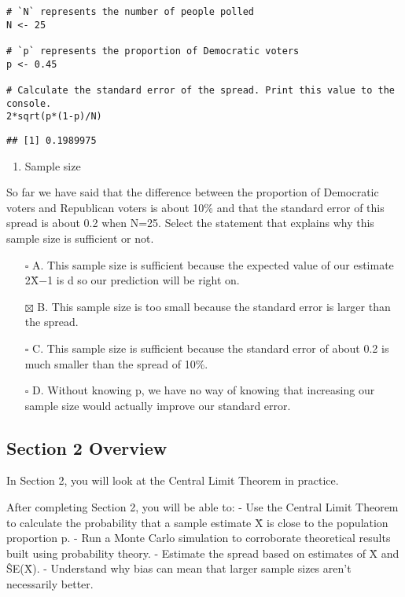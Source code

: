 \documentclass[
]{article}
\providecommand{\tightlist}{%
  \setlength{\itemsep}{0pt}\setlength{\parskip}{0pt}}
\begin{document}
\begin{verbatim}
# `N` represents the number of people polled
N <- 25

# `p` represents the proportion of Democratic voters
p <- 0.45

# Calculate the standard error of the spread. Print this value to the console.
2*sqrt(p*(1-p)/N)
\end{verbatim}

\begin{verbatim}
## [1] 0.1989975
\end{verbatim}

\begin{enumerate}
\def\labelenumi{\arabic{enumi}.}
\setcounter{enumi}{9}
\tightlist
\item
  Sample size
\end{enumerate}

So far we have said that the difference between the proportion of
Democratic voters and Republican voters is about 10\% and that the
standard error of this spread is about 0.2 when N=25. Select the
statement that explains why this sample size is sufficient or not.

\begin{itemize}
\tightlist
\item[$\square$]
  A. This sample size is sufficient because the expected value of our
  estimate 2X̄−1 is d so our prediction will be right on.
\item[$\boxtimes$]
  B. This sample size is too small because the standard error is larger
  than the spread.
\item[$\square$]
  C. This sample size is sufficient because the standard error of about
  0.2 is much smaller than the spread of 10\%.
\item[$\square$]
  D. Without knowing p, we have no way of knowing that increasing our
  sample size would actually improve our standard error.
\end{itemize}

\hypertarget{section-2-overview}{%
\subsection{Section 2 Overview}\label{section-2-overview}}

In Section 2, you will look at the Central Limit Theorem in practice.

After completing Section 2, you will be able to: - Use the Central Limit
Theorem to calculate the probability that a sample estimate X̄ is close
to the population proportion p. - Run a Monte Carlo simulation to
corroborate theoretical results built using probability theory. -
Estimate the spread based on estimates of X̄ and ŜE(X̄). - Understand why
bias can mean that larger sample sizes aren't necessarily better.
\end{document}
